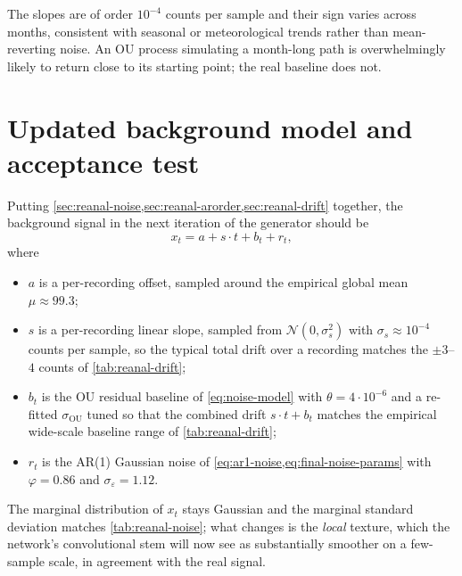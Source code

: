 The slopes are of order $10^{-4}$ counts per sample and their sign
varies across months, consistent with seasonal or meteorological
trends rather than mean-reverting noise. An OU process simulating a
month-long path is overwhelmingly likely to return close to its
starting point; the real baseline does not.

\section{Updated background model and acceptance test}
\label{sec:reanal-targets}

Putting \cref{sec:reanal-noise,sec:reanal-arorder,sec:reanal-drift}
together, the background signal in the next iteration of the generator
should be
\begin{equation}
    x_t = a + s \cdot t + b_t + r_t,
    \label{eq:reanal-bg-model}
\end{equation}
where
\begin{itemize}[leftmargin=*, itemsep=0.2em]
    \item $a$ is a per-recording offset, sampled around the empirical
    global mean $\mu \approx 99.3$;
    \item $s$ is a per-recording linear slope, sampled from
    $\mathcal{N}(0, \sigma_s^2)$ with $\sigma_s \approx 10^{-4}$
    counts per sample, so the typical total drift over a recording
    matches the $\pm 3$--$4$ counts of \cref{tab:reanal-drift};
    \item $b_t$ is the OU residual baseline of \cref{eq:noise-model}
    with $\theta = 4 \cdot 10^{-6}$ and a re-fitted
    $\sigma_{\mathrm{OU}}$ tuned so that the combined drift
    $s \cdot t + b_t$ matches the empirical wide-scale baseline range
    of \cref{tab:reanal-drift};
    \item $r_t$ is the AR(1) Gaussian noise of
    \cref{eq:ar1-noise,eq:final-noise-params} with
    $\varphi = 0.86$ and $\sigma_\varepsilon = 1.12$.
\end{itemize}

The marginal distribution of $x_t$ stays Gaussian and the marginal
standard deviation matches \cref{tab:reanal-noise}; what changes is
the \emph{local} texture, which the network's convolutional stem will
now see as substantially smoother on a few-sample scale, in agreement
with the real signal.


